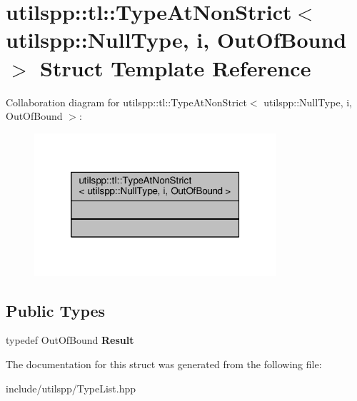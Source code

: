 \hypertarget{structutilspp_1_1tl_1_1TypeAtNonStrict_3_01utilspp_1_1NullType_00_01i_00_01OutOfBound_01_4}{\section{utilspp\-:\-:tl\-:\-:Type\-At\-Non\-Strict$<$ utilspp\-:\-:Null\-Type, i, Out\-Of\-Bound $>$ Struct Template Reference}
\label{structutilspp_1_1tl_1_1TypeAtNonStrict_3_01utilspp_1_1NullType_00_01i_00_01OutOfBound_01_4}
}


Collaboration diagram for utilspp\-:\-:tl\-:\-:Type\-At\-Non\-Strict$<$ utilspp\-:\-:Null\-Type, i, Out\-Of\-Bound $>$\-:
\nopagebreak
\begin{figure}[H]
\begin{center}
\leavevmode
\includegraphics[width=254pt]{structutilspp_1_1tl_1_1TypeAtNonStrict_3_01utilspp_1_1NullType_00_01i_00_01OutOfBound_01_4__coll__graph}
\end{center}
\end{figure}
\subsection*{Public Types}
\begin{DoxyCompactItemize}
\item 
\hypertarget{structutilspp_1_1tl_1_1TypeAtNonStrict_3_01utilspp_1_1NullType_00_01i_00_01OutOfBound_01_4_a59206b4646725a9324127ea0806d0430}{typedef Out\-Of\-Bound {\bfseries Result}}\label{structutilspp_1_1tl_1_1TypeAtNonStrict_3_01utilspp_1_1NullType_00_01i_00_01OutOfBound_01_4_a59206b4646725a9324127ea0806d0430}

\end{DoxyCompactItemize}


The documentation for this struct was generated from the following file\-:\begin{DoxyCompactItemize}
\item 
include/utilspp/Type\-List.\-hpp\end{DoxyCompactItemize}

